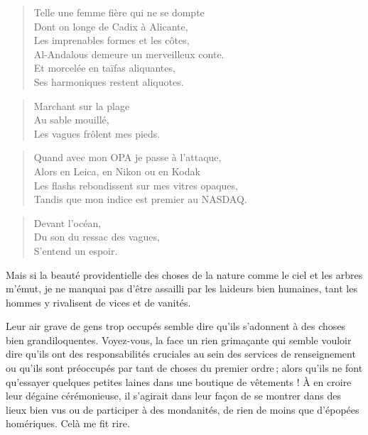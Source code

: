 \begin{verse}
Telle une femme fière qui ne se dompte\\
Dont on longe de Cadix à Alicante,\\
Les imprenables formes et les côtes,\\
Al-Andalous demeure un merveilleux conte.\\
Et morcelée en taïfas aliquantes,\\
Ses harmoniques restent aliquotes.
\end{verse}

\begin{verse}
Marchant sur la plage\\
Au sable mouillé,\\
Les vagues frôlent mes pieds.
\end{verse}

\begin{verse}
Quand avec mon OPA je passe à l’attaque,\\
Alors en Leica, en Nikon ou en Kodak\\
Les flashs rebondissent sur mes vitres opaques,\\
Tandis que mon indice est premier au NASDAQ.
\end{verse}

\begin{verse}
Devant l’océan,\\
Du son du ressac des vagues,\\
S’entend un espoir.
\end{verse}

\begin{prose}
Mais si la beauté providentielle des choses de la nature comme le ciel et les arbres m’émut, je ne manquai pas d’être assailli par les laideurs bien humaines, tant les hommes y rivalisent de vices et de vanités. 

Leur air grave de gens trop occupés semble dire qu’ils s’adonnent à des choses bien grandiloquentes. Voyez-vous, la face un rien grimaçante qui semble vouloir dire qu’ils ont des responsabilités cruciales au sein des services de renseignement ou qu’ils sont préoccupés par tant de choses du premier ordre\,; alors qu’ils ne font qu’essayer quelques petites laines dans une boutique de vêtements ! À en croire leur dégaine cérémonieuse, il s’agirait dans leur façon de se montrer dans des lieux bien vus ou de participer à des mondanités, de rien de moins que d’épopées homériques. Celà  me fit rire.
\end{prose}

